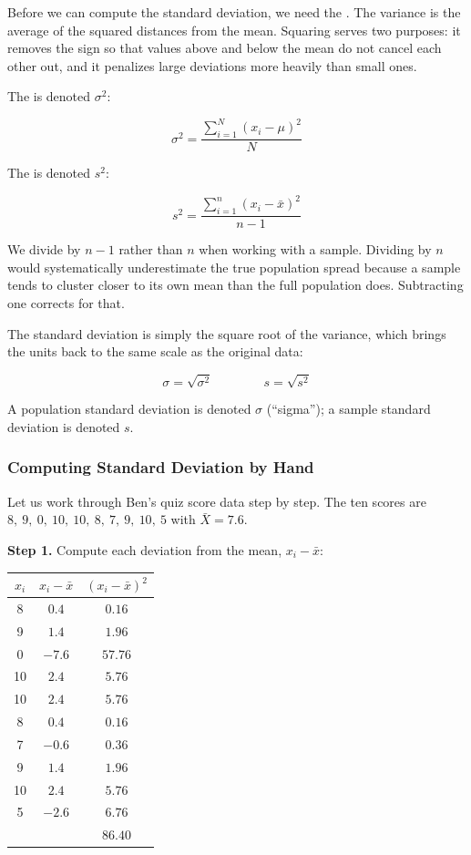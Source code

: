 Before we can compute the standard deviation, we need the
. The variance is the average of the
squared distances from the mean. Squaring serves two purposes: it
removes the sign so that values above and below the mean do not cancel
each other out, and it penalizes large deviations more heavily than
small ones.

The  is denoted
$\sigma^2$:

\[
\sigma^2 = \frac{\displaystyle\sum_{i=1}^{N}(x_i - \mu)^2}{N}
\]

The  is denoted $s^2$:

\[
s^2 = \frac{\displaystyle\sum_{i=1}^{n}(x_i - \bar{x})^2}{n-1}
\]

We divide by $n - 1$ rather than $n$ when working with a sample.
Dividing by $n$ would systematically underestimate the true population
spread because a sample tends to cluster closer to its own mean than
the full population does. Subtracting one corrects for that.

The standard deviation is simply the square root of the variance, which
brings the units back to the same scale as the original data:

\[
\sigma = \sqrt{\sigma^2}
\qquad \qquad
s = \sqrt{s^2}
\]

A population standard deviation is denoted $\sigma$ (``sigma''); a
sample standard deviation is denoted $s$.

\subsubsection*{Computing Standard Deviation by Hand}

Let us work through Ben's quiz score data step by step. The ten
scores are $8,\ 9,\ 0,\ 10,\ 10,\ 8,\ 7,\ 9,\ 10,\ 5$ with $\bar{X} = 7.6$.

\textbf{Step 1.} Compute each deviation from the mean, $x_i - \bar{x}$:

\begin{center}
\begin{tabular}{ccc}
$x_i$ & $x_i - \bar{x}$ & $(x_i - \bar{x})^2$ \\
\hline
8  & $0.4$  & $0.16$ \\
9  & $1.4$  & $1.96$ \\
0  & $-7.6$ & $57.76$ \\
10 & $2.4$  & $5.76$ \\
10 & $2.4$  & $5.76$ \\
8  & $0.4$  & $0.16$ \\
7  & $-0.6$ & $0.36$ \\
9  & $1.4$  & $1.96$ \\
10 & $2.4$  & $5.76$ \\
5  & $-2.6$ & $6.76$ \\
\hline
   &        & $86.40$ \\
\end{tabular}
\end{center}

